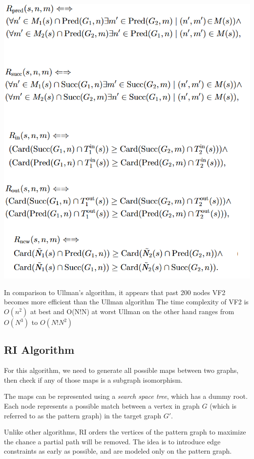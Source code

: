 \documentclass{article}
\begin{document}
    \includegraphics{../images/vf2_algo.png}

  In comparison to Ullman's algorithm, it appears that past 200 nodes VF2 becomes more efficient than the Ullman algorithm
  The time complexity of VF2 is $O(n^2)$ at best and O(N!N) at worst
  Ullman on the other hand ranges from $O(N^3)$ to $O(N!N^2)$
  \cite{cordella}

  \subsection{RI Algorithm}

  For this algorithm, we need to generate all possible maps between two graphs, then check if any of those maps is a subgraph isomorphism.

  The maps can be represented using a \textit{search space tree}, which has a dummy root. Each node represents a possible match between a vertex in graph $G$ (which is referred to as the pattern graph) in the target graph $G'$.

  Unlike other algorithms, RI orders the vertices of the pattern graph to maximize the chance a partial path will be removed. The idea is to introduce edge constraints as early as possible, and are modeled only on the pattern graph.
\end{document}
